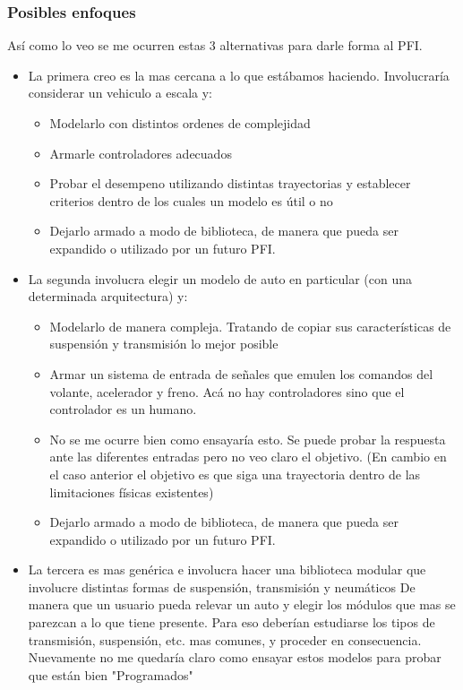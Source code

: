 \documentclass[12pt,a4paper,fleqn]{report}
\begin{document}
\subsubsection*{Posibles enfoques}
Así como lo veo se me ocurren estas 3 alternativas para darle forma al PFI.
\begin{itemize}
	\item La primera creo es la mas cercana a lo que estábamos haciendo. Involucraría considerar un vehiculo a escala y: 
		\begin{itemize}
			\item Modelarlo con distintos ordenes de complejidad
			\item Armarle controladores adecuados
			\item Probar el desempeno utilizando distintas trayectorias y establecer criterios dentro de los cuales un modelo es útil o no
			\item Dejarlo armado a modo de biblioteca, de manera que pueda ser expandido o utilizado por un futuro PFI.
		\end{itemize}
	\item La segunda involucra elegir un modelo de auto en particular (con una determinada arquitectura) y:
		\begin{itemize}
			\item Modelarlo de manera compleja. Tratando de copiar sus características de suspensión y transmisión lo mejor posible
			\item Armar un sistema de entrada de señales que emulen los comandos del volante, acelerador y freno. Acá no hay controladores sino que el controlador es un humano.
			\item No se me ocurre bien como ensayaría esto. Se puede probar la respuesta ante las diferentes entradas pero no veo claro el objetivo. (En cambio en el caso anterior el objetivo es que siga una trayectoria dentro de las limitaciones físicas existentes)
			\item Dejarlo armado a modo de biblioteca, de manera que pueda ser expandido o utilizado por un futuro PFI.
		\end{itemize}		
	\item La tercera es mas genérica e involucra hacer una biblioteca modular que involucre distintas formas de suspensión, transmisión y neumáticos De manera que un usuario pueda relevar un auto y elegir los módulos que mas se parezcan a lo que tiene presente. Para eso deberían estudiarse los tipos de transmisión, suspensión, etc. mas comunes, y proceder en consecuencia. Nuevamente no me quedaría claro como ensayar estos modelos para probar que están bien "Programados"
\end{itemize}
\end{document}
